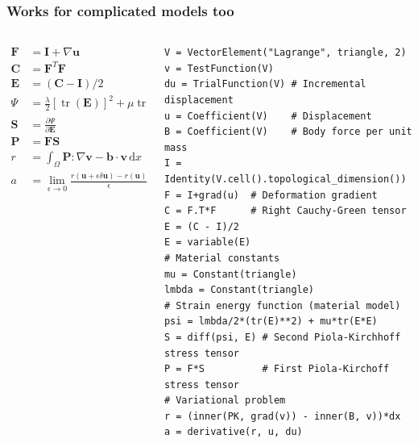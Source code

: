 \documentclass[presentation, 10pt]{beamer}
\DeclareMathOperator{\tr}{tr}
\begin{document}
\begin{frame}[fragile]
  \frametitle{Works for complicated models too}
  \begin{columns}
    \begin{column}{0.5\textwidth}
      \begin{align*}
        \mathbf{F} &= \mathbf{I} + \nabla \mathbf{u}\\
        \mathbf{C} &= \mathbf{F}^T \mathbf{F}\\
        \mathbf{E} &= (\mathbf{C} - \mathbf{I}) / 2\\
        \Psi &= \frac{\lambda}{2}[\tr(\mathbf{E})]^2 + \mu \tr(\mathbf{E}^2)\\
        \mathbf{S} &= \frac{\partial \Psi}{\partial \mathbf{E}}\\
        \mathbf{P} &= \mathbf{F} \mathbf{S}\\
        r &= \int_\Omega \mathbf{P} : \nabla \mathbf{v} - \mathbf{b} \cdot \mathbf{v}\,\text{d}x\\
        a &= \lim_{\epsilon \to 0} \frac{r(\mathbf{u} + \epsilon \delta \mathbf{u}) - r(\mathbf{u})}{\epsilon}
      \end{align*}
    \end{column}
    \begin{column}{0.5\textwidth}
\begin{verbatim}
V = VectorElement("Lagrange", triangle, 2)
v = TestFunction(V)
du = TrialFunction(V) # Incremental displacement
u = Coefficient(V)    # Displacement
B = Coefficient(V)    # Body force per unit mass
I = Identity(V.cell().topological_dimension())
F = I+grad(u)  # Deformation gradient
C = F.T*F      # Right Cauchy-Green tensor
E = (C - I)/2
E = variable(E)
# Material constants
mu = Constant(triangle)
lmbda = Constant(triangle)
# Strain energy function (material model)
psi = lmbda/2*(tr(E)**2) + mu*tr(E*E)
S = diff(psi, E) # Second Piola-Kirchhoff stress tensor
P = F*S          # First Piola-Kirchoff stress tensor
# Variational problem
r = (inner(PK, grad(v)) - inner(B, v))*dx
a = derivative(r, u, du)
\end{verbatim}
    \end{column}
  \end{columns}  
\end{frame}
\end{document}
